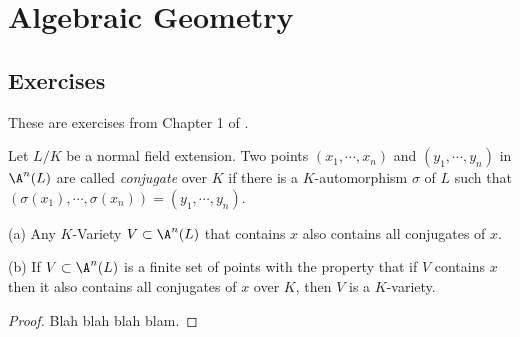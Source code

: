\documentclass[oneside,12pt]{amsart}
\begin{document}

\section{Algebraic Geometry}


\subsection{Exercises}
These are exercises from Chapter 1 of \cite{Kunz_Book}.

\begin{exercise}
Let $L/K$ be a normal field extension. Two points $(x_1,\cdots,x_n)$ and $(y_1,\cdots,y_n)$ in
$\A^n(L)$ are called \emph{conjugate} over $K$ if there is a $K$-automorphism $\sigma$ of $L$
such that $(\sigma(x_1),\cdots,\sigma(x_n))=(y_1,\cdots,y_n)$.

(a) Any $K$-Variety $V\subset\A^n(L)$ that contains $x$ also contains all conjugates of $x$.

(b) If $V\subset\A^n(L)$ is a finite set of points with the property that if $V$ contains $x$
then it also contains all conjugates of $x$ over $K$, then $V$ is a $K$-variety.
\end{exercise}
\begin{proof}
Blah blah blah blam.
\end{proof}





\end{document}
